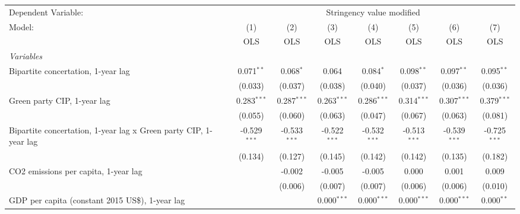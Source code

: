 
\begingroup
\centering
\begin{tabular}{lccccccc}
   \toprule
   Dependent Variable: & \multicolumn{7}{c}{Stringency value modified}\\
   Model:                                                           & (1)            & (2)            & (3)            & (4)            & (5)            & (6)            & (7)\\  
                                                                    &  OLS           & OLS            & OLS            & OLS            & OLS            & OLS            & OLS\\  
   \midrule
   \emph{Variables}\\
   Bipartite concertation, 1-year lag                               & 0.071$^{**}$   & 0.068$^{*}$    & 0.064          & 0.084$^{*}$    & 0.098$^{**}$   & 0.097$^{**}$   & 0.095$^{**}$\\   
                                                                    & (0.033)        & (0.037)        & (0.038)        & (0.040)        & (0.037)        & (0.036)        & (0.036)\\   
   Green party CIP, 1-year lag                                      & 0.283$^{***}$  & 0.287$^{***}$  & 0.263$^{***}$  & 0.286$^{***}$  & 0.314$^{***}$  & 0.307$^{***}$  & 0.379$^{***}$\\   
                                                                    & (0.055)        & (0.060)        & (0.063)        & (0.047)        & (0.067)        & (0.063)        & (0.081)\\   
   Bipartite concertation, 1-year lag x Green party CIP, 1-year lag & -0.529$^{***}$ & -0.533$^{***}$ & -0.522$^{***}$ & -0.532$^{***}$ & -0.513$^{***}$ & -0.539$^{***}$ & -0.725$^{***}$\\   
                                                                    & (0.134)        & (0.127)        & (0.145)        & (0.142)        & (0.142)        & (0.135)        & (0.182)\\   
   CO2 emissions per capita, 1-year lag                             &                & -0.002         & -0.005         & -0.005         & 0.000          & 0.001          & 0.009\\   
                                                                    &                & (0.006)        & (0.007)        & (0.007)        & (0.006)        & (0.006)        & (0.010)\\   
   GDP per capita (constant 2015 US\$), 1-year lag                  &                &                & 0.000$^{***}$  & 0.000$^{***}$  & 0.000$^{***}$  & 0.000$^{***}$  & 0.000$^{**}$\\   

\end{tabular}
